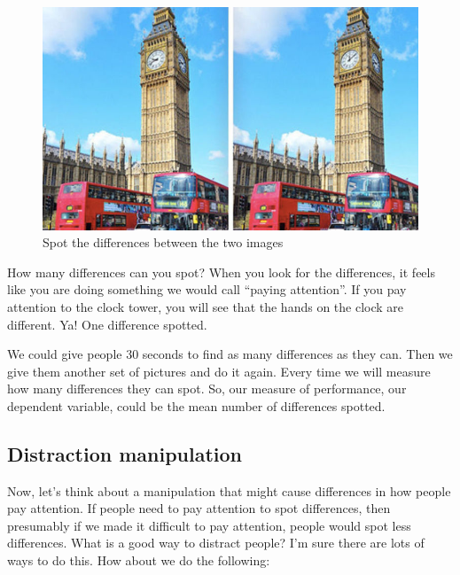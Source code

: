 \documentclass[]{book}
\begin{document}
\begin{figure}
\centering
\includegraphics{figures/spot_dif.png}
\caption{\label{fig:9spotdiff}Spot the differences between the two images}
\end{figure}

How many differences can you spot? When you look for the differences, it feels like you are doing something we would call ``paying attention''. If you pay attention to the clock tower, you will see that the hands on the clock are different. Ya! One difference spotted.

We could give people 30 seconds to find as many differences as they can. Then we give them another set of pictures and do it again. Every time we will measure how many differences they can spot. So, our measure of performance, our dependent variable, could be the mean number of differences spotted.

\hypertarget{distraction-manipulation}{%
\subsection{Distraction manipulation}\label{distraction-manipulation}}

Now, let's think about a manipulation that might cause differences in how people pay attention. If people need to pay attention to spot differences, then presumably if we made it difficult to pay attention, people would spot less differences. What is a good way to distract people? I'm sure there are lots of ways to do this. How about we do the following:
\end{document}
